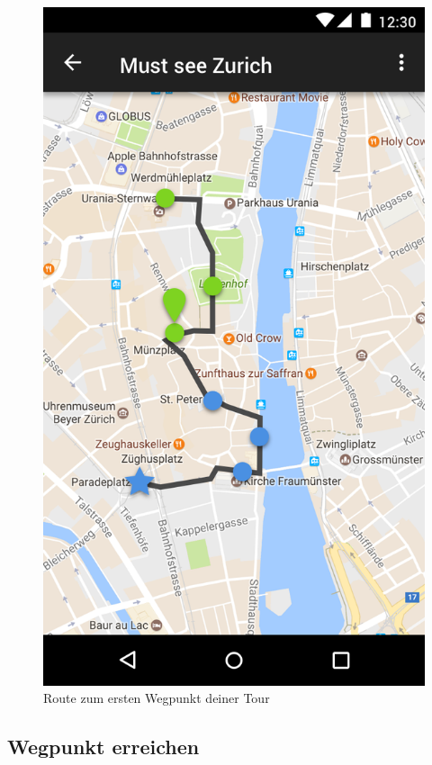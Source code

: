 \documentclass[a4paper,10pt,xetex]{article}
\begin{document}
\begin{figure}
  \hfill
  \begin{minipage}[b]{0.48\textwidth}
    \includegraphics[width=\textwidth]{TourActivity}
    \caption{Route zum ersten Wegpunkt deiner Tour}
  \end{minipage}
\end{figure}


\newpage
\subsection{Wegpunkt erreichen}
\end{document}
